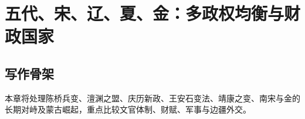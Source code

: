 \chapter{五代、宋、辽、夏、金：多政权均衡与财政国家}
\section{写作骨架}
本章将处理陈桥兵变、澶渊之盟、庆历新政、王安石变法、靖康之变、南宋与金的长期对峙及蒙古崛起，重点比较文官体制、财赋、军事与边疆外交。
